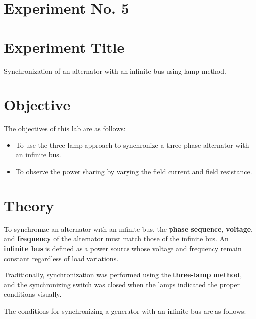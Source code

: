 \documentclass[a4paper,12pt]{article}
\begin{document}
	\section{Experiment No. 5}
	
	\section{Experiment Title }
Synchronization of an alternator with an infinite bus using lamp method.
	
	\section{Objective}
	
	The objectives of this lab are as follows:
	\begin{itemize}
		\item 	To use the three-lamp approach to synchronize a three-phase alternator with an infinite bus.
		\item 	To observe the power sharing by varying the field current and field resistance.
	
		
		
	\end{itemize}
	
\section{Theory}

To synchronize an alternator with an infinite bus, the \textbf{phase sequence}, \textbf{voltage}, and \textbf{frequency} of the alternator must match those of the infinite bus. An \textbf{infinite bus} is defined as a power source whose voltage and frequency remain constant regardless of load variations.

Traditionally, synchronization was performed using the \textbf{three-lamp method}, and the synchronizing switch was closed when the lamps indicated the proper conditions visually.

The conditions for synchronizing a generator with an infinite bus are as follows:
\end{document}

